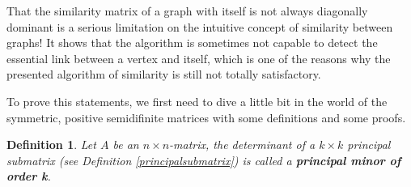 \documentclass[a4paper,11pt]{report}
\newtheorem{definition}[theorem]{Definition}
\begin{document}
That the similarity matrix of a graph with itself is not always diagonally dominant is a serious limitation
on the intuitive concept of similarity between graphs! It shows that the 
algorithm is sometimes not capable to detect the essential link between a vertex and itself, which is one of 
the reasons why the presented algorithm of similarity is still not totally 
satisfactory.

To prove this statements, we first need to dive a little bit in the world of the 
symmetric, positive semidifinite matrices with some definitions and some proofs.

\begin{definition}
  Let $A$ be an $n \times n$-matrix, the determinant of a $k \times k$ principal submatrix (see Definition \ref{principalsubmatrix}) 
  is called a \textbf{principal minor of order k}.
\end{definition}
\end{document}
